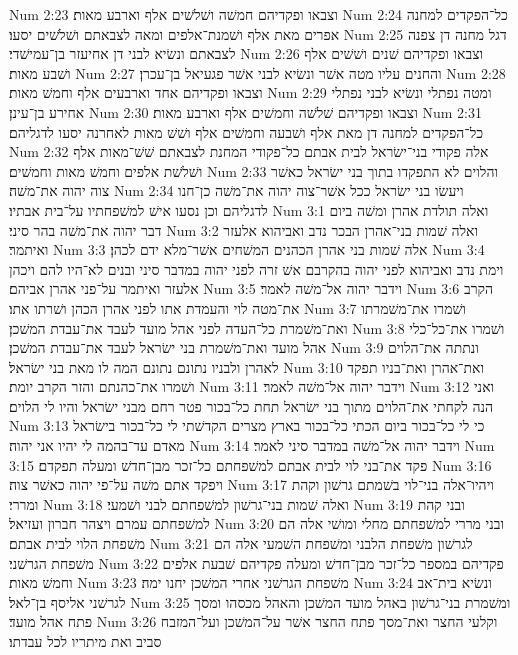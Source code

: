 Num 2:23  וצבאו ופקדיהם חמשׁה ושׁלשׁים אלף וארבע מאות׃
Num 2:24  כל־הפקדים למחנה אפרים מאת אלף ושׁמנת־אלפים ומאה לצבאתם ושׁלשׁים יסעו׃
Num 2:25  דגל מחנה דן צפנה לצבאתם ונשׂיא לבני דן אחיעזר בן־עמישׁדי׃
Num 2:26  וצבאו ופקדיהם שׁנים ושׁשׁים אלף ושׁבע מאות׃
Num 2:27  והחנים עליו מטה אשׁר ונשׂיא לבני אשׁר פגעיאל בן־עכרן׃
Num 2:28  וצבאו ופקדיהם אחד וארבעים אלף וחמשׁ מאות׃
Num 2:29  ומטה נפתלי ונשׂיא לבני נפתלי אחירע בן־עינן׃
Num 2:30  וצבאו ופקדיהם שׁלשׁה וחמשׁים אלף וארבע מאות׃
Num 2:31  כל־הפקדים למחנה דן מאת אלף ושׁבעה וחמשׁים אלף ושׁשׁ מאות לאחרנה יסעו לדגליהם׃
Num 2:32  אלה פקודי בני־ישׂראל לבית אבתם כל־פקודי המחנת לצבאתם שׁשׁ־מאות אלף ושׁלשׁת אלפים וחמשׁ מאות וחמשׁים׃
Num 2:33  והלוים לא התפקדו בתוך בני ישׂראל כאשׁר צוה יהוה את־משׁה׃
Num 2:34  ויעשׂו בני ישׂראל ככל אשׁר־צוה יהוה את־משׁה כן־חנו לדגליהם וכן נסעו אישׁ למשׁפחתיו על־בית אבתיו׃
Num 3:1  ואלה תולדת אהרן ומשׁה ביום דבר יהוה את־משׁה בהר סיני׃
Num 3:2  ואלה שׁמות בני־אהרן הבכר נדב ואביהוא אלעזר ואיתמר׃
Num 3:3  אלה שׁמות בני אהרן הכהנים המשׁחים אשׁר־מלא ידם לכהן׃
Num 3:4  וימת נדב ואביהוא לפני יהוה בהקרבם אשׁ זרה לפני יהוה במדבר סיני ובנים לא־היו להם ויכהן אלעזר ואיתמר על־פני אהרן אביהם׃
Num 3:5  וידבר יהוה אל־משׁה לאמר׃
Num 3:6  הקרב את־מטה לוי והעמדת אתו לפני אהרן הכהן ושׁרתו אתו׃
Num 3:7  ושׁמרו את־משׁמרתו ואת־משׁמרת כל־העדה לפני אהל מועד לעבד את־עבדת המשׁכן׃
Num 3:8  ושׁמרו את־כל־כלי אהל מועד ואת־משׁמרת בני ישׂראל לעבד את־עבדת המשׁכן׃
Num 3:9  ונתתה את־הלוים לאהרן ולבניו נתונם נתונם המה לו מאת בני ישׂראל׃
Num 3:10  ואת־אהרן ואת־בניו תפקד ושׁמרו את־כהנתם והזר הקרב יומת׃
Num 3:11  וידבר יהוה אל־משׁה לאמר׃
Num 3:12  ואני הנה לקחתי את־הלוים מתוך בני ישׂראל תחת כל־בכור פטר רחם מבני ישׂראל והיו לי הלוים׃
Num 3:13  כי לי כל־בכור ביום הכתי כל־בכור בארץ מצרים הקדשׁתי לי כל־בכור בישׂראל מאדם עד־בהמה לי יהיו אני יהוה׃
Num 3:14  וידבר יהוה אל־משׁה במדבר סיני לאמר׃
Num 3:15  פקד את־בני לוי לבית אבתם למשׁפחתם כל־זכר מבן־חדשׁ ומעלה תפקדם׃
Num 3:16  ויפקד אתם משׁה על־פי יהוה כאשׁר צוה׃
Num 3:17  ויהיו־אלה בני־לוי בשׁמתם גרשׁון וקהת ומררי׃
Num 3:18  ואלה שׁמות בני־גרשׁון למשׁפחתם לבני ושׁמעי׃
Num 3:19  ובני קהת למשׁפחתם עמרם ויצהר חברון ועזיאל׃
Num 3:20  ובני מררי למשׁפחתם מחלי ומושׁי אלה הם משׁפחת הלוי לבית אבתם׃
Num 3:21  לגרשׁון משׁפחת הלבני ומשׁפחת השׁמעי אלה הם משׁפחת הגרשׁני׃
Num 3:22  פקדיהם במספר כל־זכר מבן־חדשׁ ומעלה פקדיהם שׁבעת אלפים וחמשׁ מאות׃
Num 3:23  משׁפחת הגרשׁני אחרי המשׁכן יחנו ימה׃
Num 3:24  ונשׂיא בית־אב לגרשׁני אליסף בן־לאל׃
Num 3:25  ומשׁמרת בני־גרשׁון באהל מועד המשׁכן והאהל מכסהו ומסך פתח אהל מועד׃
Num 3:26  וקלעי החצר ואת־מסך פתח החצר אשׁר על־המשׁכן ועל־המזבח סביב ואת מיתריו לכל עבדתו׃
